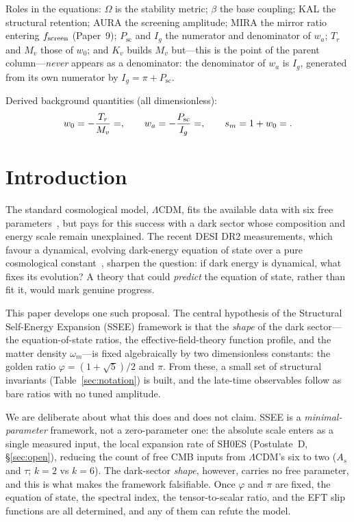\documentclass[aps,prd,preprint,amsmath,amssymb,nofootinbib,longbibliography]{revtex4-2}
\begin{document}
\noindent Roles in the equations: $\Omega$ is the stability metric; $\beta$ the
base coupling; KAL the structural retention; AURA the screening amplitude; MIRA
the mirror ratio entering $f_{\rm screen}$ (Paper~9); $P_{\mathrm{sc}}$ and $I_g$
the numerator and denominator of $w_a$; $T_r$ and $M_v$ those of $w_0$; and $K_v$
builds $M_v$ but---this is the point of the parent column---\emph{never} appears
as a denominator: the denominator of $w_a$ is $I_g$, generated from its own
numerator by $I_g=\pi+P_{\mathrm{sc}}$.

\noindent Derived background quantities (all dimensionless):
\begin{equation*}
w_0=-\frac{T_r}{M_v}=\val{W0_d6},\qquad
w_a=-\frac{P_{\mathrm{sc}}}{I_g}=\val{WA_d6},\qquad
s_m=1+w_0=\val{S_M_d6} .
\end{equation*}


\section{Introduction}
\label{sec:intro}

The standard cosmological model, $\Lambda$CDM, fits the available data with six
free parameters~\citep{Planck2018}, but pays for this success with a dark sector whose composition
and energy scale remain unexplained. The recent DESI DR2 measurements, which
favour a dynamical, evolving dark-energy equation of state over a pure
cosmological constant~\citep{AbdulKarim2025}, sharpen the question: if dark
energy is dynamical, what fixes its evolution? A theory that could
\emph{predict} the equation of state, rather than fit it, would mark genuine
progress.

This paper develops one such proposal. The central hypothesis of the
Structural Self-Energy Expansion (SSEE) framework is that the \emph{shape} of
the dark sector---the equation-of-state ratios, the effective-field-theory function profile, and the matter density $\omega_m$---is fixed algebraically by two dimensionless constants: the golden
ratio $\varphi=(1+\sqrt5)/2$ and $\pi$. From these, a small set of structural
invariants (Table~\ref{sec:notation}) is built, and the late-time observables
follow as bare ratios with no tuned amplitude.

We are deliberate about what this does and does not claim. SSEE is a
\emph{minimal-parameter} framework, not a zero-parameter one: the absolute scale
enters as a single measured input, the local expansion rate of SH0ES (Postulate~D,
\S\ref{sec:open}), reducing the count of free CMB inputs from $\Lambda$CDM's
six to two ($A_s$ and $\tau$; $k=2$ vs $k=6$). The dark-sector \emph{shape}, however, carries no free
parameter, and this is what makes the framework falsifiable. Once $\varphi$ and
$\pi$ are fixed, the equation of state, the spectral index, the
tensor-to-scalar ratio, and the EFT slip functions are all determined, and any
of them can refute the model.
\end{document}
